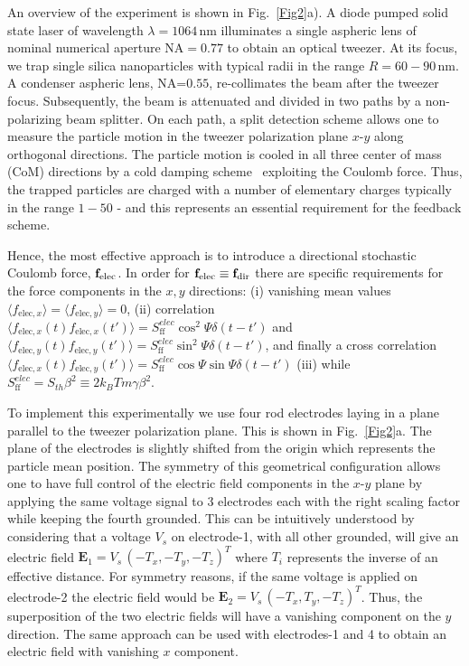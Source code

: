 \documentclass[twocolumn,english,notitlepage,superscriptaddress,nofootinbib]{revtex4-2}
\begin{document}
An overview of the experiment is shown in Fig.~\ref{Fig2}a).  A diode pumped solid state laser of wavelength $\lambda=1064$\,nm illuminates a single aspheric lens of nominal numerical aperture NA$=0.77$ to obtain an optical tweezer.  At its focus, we trap single silica nanoparticles with typical radii in the range $R=60-90$\,nm.  A condenser aspheric lens, NA=$0.55$, re-collimates the beam after the tweezer focus.  Subsequently,  the beam is attenuated and divided in two paths by a non-polarizing beam splitter.  On each path, a split detection scheme allows one to measure the particle motion in the tweezer polarization plane $x$-$y$ along orthogonal directions. The particle motion is cooled in all three center of mass (CoM) directions by a cold damping scheme~\cite{poggio2007feedback,Novotny2021quantum,Magrini2021real,kamba2021recoil} exploiting the Coulomb force.  Thus,  the trapped particles are charged with a number of elementary charges  typically in the range $1-50$
- and this represents an essential requirement for the feedback scheme.

Hence,  the  most effective approach is  to introduce a directional stochastic Coulomb force, ${\bf f}_{\text{elec}}$.   In order for ${\bf f}_{\text{elec}} \equiv {\bf f}_{\text{dir}}$ there are specific requirements for the force components in the $x,y$ directions:  (i) vanishing mean values $\langle f_{\text{elec},x} \rangle =\langle f_{\text{elec},y} \rangle =0$,  (ii) correlation $\langle f_{\text{elec},x}(t)f_{\text{elec},x}(t')\rangle=S_{\text{ff}}^{elec} \cos^2 \Psi \delta(t-t')$ and $\langle f_{\text{elec},y}(t)f_{\text{elec},y}(t')\rangle=S_{\text{ff}}^{elec} \sin^2\Psi \delta(t-t')$,  and finally a cross correlation $\langle f_{\text{elec},x}(t)f_{\text{elec},y}(t')\rangle=S_{\text{ff}}^{elec} \cos\Psi\sin\Psi \delta(t-t')$ (iii) while $S_{\text{ff}}^{elec}=S_{th} \beta^2\equiv 2k_BTm \gamma \beta^2$.

To implement this experimentally we use four rod electrodes laying in a plane parallel to the tweezer polarization plane. This is shown in Fig.~\ref{Fig2}a.  The plane of the electrodes is slightly shifted from the origin which represents the particle mean position. The symmetry of this geometrical configuration allows one to have full control of the electric field components in the $x$-$y$ plane by applying the same voltage signal to 3 electrodes each with the right scaling factor while keeping the fourth grounded. This can be intuitively understood by considering that a voltage $V_s$ on electrode-1, with all other grounded, will give an electric field $\textbf{E}_1=V_s\, (-T_x,-T_y,-T_z)^T$ where $T_i$ represents the inverse of an effective distance.  For symmetry reasons, if the same voltage is applied on electrode-2 the electric field would be $\textbf{E}_2=V_s\,(-T_x,T_y,-T_z)^T$. Thus, the superposition of the two electric fields will have a vanishing component on the $y$ direction. The same approach can be used with electrodes-1 and 4 to obtain an electric field with vanishing $x$ component.
\end{document}
